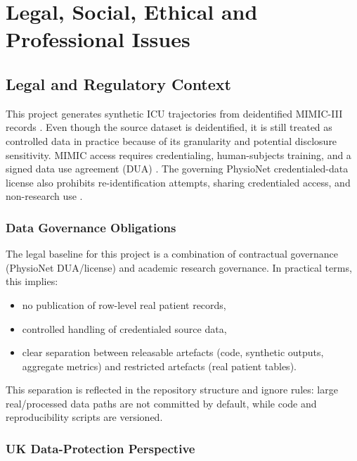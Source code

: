 \chapter{Legal, Social, Ethical and Professional Issues}

\section{Legal and Regulatory Context}

This project generates synthetic ICU trajectories from deidentified MIMIC-III records \cite{johnson2016mimic}. Even though the source dataset is deidentified, it is still treated as controlled data in practice because of its granularity and potential disclosure sensitivity. MIMIC access requires credentialing, human-subjects training, and a signed data use agreement (DUA) \cite{mimicGettingStarted}. The governing PhysioNet credentialed-data license also prohibits re-identification attempts, sharing credentialed access, and non-research use \cite{physionetCredentialedLicense150}.

\subsection{Data Governance Obligations}

The legal baseline for this project is a combination of contractual governance (PhysioNet DUA/license) and academic research governance. In practical terms, this implies:
\begin{itemize}\tightlist
    \item no publication of row-level real patient records,
    \item controlled handling of credentialed source data,
    \item clear separation between releasable artefacts (code, synthetic outputs, aggregate metrics) and restricted artefacts (real patient tables).
\end{itemize}

This separation is reflected in the repository structure and ignore rules: large real/processed data paths are not committed by default, while code and reproducibility scripts are versioned.

\subsection{UK Data-Protection Perspective}


